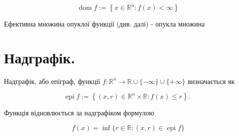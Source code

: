 \documentclass[10pt]{article}
\begin{document}
$$
\operatorname{dom} f:=\left\{x \in \mathbb{R}^{n}: f(x)<\infty\right\}
$$

Ефективна множина опуклої функції (див. далі) - опукла множина

\section*{Надграфік.}
Надграфік, або епіграф, функції $f: \mathbb{R}^{n} \rightarrow \mathbb{R} \cup\{-\infty\} \cup\{+\infty\}$ визначається як

$$
\operatorname{epi} f:=\left\{(x, r) \in \mathbb{R}^{n} \times \mathbb{R}: f(x) \leq r\right\} \text {. }
$$

Функція відновлюється за надграфіком формулою

$$
f(x)=\inf \{r \in \mathbb{R}:(x, r) \in \operatorname{epi} f\}
$$
\end{document}

